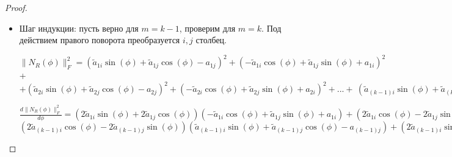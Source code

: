 \begin{proof}
\begin{itemize}
    \item Шаг индукции: пусть верно для $m = k-1$, проверим для $m = k$. Под действием правого поворота преобразуется $i, j$ столбец.
    \begin{center}
        $\|N_R(\phi) \|_F^2 = \left(\tilde{a}_{1i} \sin{\left(\phi \right)} + \tilde{a}_{1j} \cos{\left(\phi \right)} - {a}_{1j}\right)^{2} + \left(- \tilde{a}_{1i} \cos{\left(\phi \right)} + \tilde{a}_{1j} \sin{\left(\phi \right)} + {a}_{1i}\right)^{2}$+ \newline$+ \left(\tilde{a}_{2i} \sin{\left(\phi \right)} + \tilde{a}_{2j} \cos{\left(\phi \right)} - {a}_{2j}\right)^{2} + \left(- \tilde{a}_{2i} \cos{\left(\phi \right)} + \tilde{a}_{2j} \sin{\left(\phi \right)} + {a}_{2i}\right)^{2} +... + \  
        \left(\tilde{a}_{(k-1)i} \sin{\left(\phi \right)} + \tilde{a}_{(k-1)j} \cos{\left(\phi \right)} - {a}_{(k-1)j}\right)^{2} + \left(- \tilde{a}_{(k-1)i} \cos{\left(\phi \right)} + \tilde{a}_{(k-1)j} \sin{\left(\phi \right)} + {a}_{(k-1)i}\right)^{2} +
        \left(\tilde{a}_{ki} \sin{\left(\phi \right)} + \tilde{a}_{kj} \cos{\left(\phi \right)} - {a}_{kj}\right)^{2} + \left(- \tilde{a}_{ki} \cos{\left(\phi \right)} + \tilde{a}_{ki} \sin{\left(\phi \right)} + {a}_{ki}\right)^{2}
        $
    \end{center}
    \begin{center}
        $\frac{d\|N_R(\phi) \|_F^2}{d\phi} = \left(2 \tilde{a}_{1i} \sin{\left(\phi \right)} + 2 \tilde{a}_{1j} \cos{\left(\phi \right)}\right) \left(- \tilde{a}_{1i} \cos{\left(\phi \right)} + \tilde{a}_{1j} \sin{\left(\phi \right)} + {a}_{1i}\right) + \left(2 \tilde{a}_{1i} \cos{\left(\phi \right)} - 2 \tilde{a}_{1j} \sin{\left(\phi \right)}\right) \left(\tilde{a}_{1i} \sin{\left(\phi \right)} + \tilde{a}_{1j} \cos{\left(\phi \right)} - {a}_{1j}\right) + \left(2 \tilde{a}_{2i} \sin{\left(\phi \right)} + 2 \tilde{a}_{2j} \cos{\left(\phi \right)}\right) \left(- \tilde{a}_{2i} \cos{\left(\phi \right)} + \tilde{a}_{2j} \sin{\left(\phi \right)} + {a}_{2i}\right) + \left(2 \tilde{a}_{2i} \cos{\left(\phi \right)} - 2 \tilde{a}_{2j} \sin{\left(\phi \right)}\right) \left(\tilde{a}_{2i} \sin{\left(\phi \right)} + \tilde{a}_{2j} \cos{\left(\phi \right)} - {a}_{2j}\right) + ... + $ \newline
        $ \left(2 \tilde{a}_{(k-1)i} \cos{\left(\phi \right)} - 2 \tilde{a}_{(k-1)j} \sin{\left(\phi \right)}\right) \left(\tilde{a}_{(k-1)i} \sin{\left(\phi \right)} + \tilde{a}_{(k-1)j} \cos{\left(\phi \right)} - {a}_{(k-1)j}\right) + \left(2 \tilde{a}_{(k-1)i} \sin{\left(\phi \right)} + 2 \tilde{a}_{(k-1)j} \cos{\left(\phi \right)}\right) \left(-\tilde{a}_{(k-1)i} \cos{\left(\phi \right)} + \tilde{a}_{(k-1)j} \sin{\left(\phi \right)} - {a}_{(k-1)i}\right) + \left(2 \tilde{a}_{ki} \cos{\left(\phi \right)} - 2 \tilde{a}_{kj} \sin{\left(\phi \right)}\right) \left(\tilde{a}_{ki} \sin{\left(\phi \right)} + \tilde{a}_{kj} \cos{\left(\phi \right)} - {a}_{kj}\right) + \left(2 \tilde{a}_{ki} \sin{\left(\phi \right)} + 2 \tilde{a}_{kj} \cos{\left(\phi \right)}\right) \left(-\tilde{a}_{ki} \cos{\left(\phi \right)} + \tilde{a}_{kj} \sin{\left(\phi \right)} - {a}_{ki}\right) =$ \newline

\end{center}
\end{itemize}
\end{proof}
